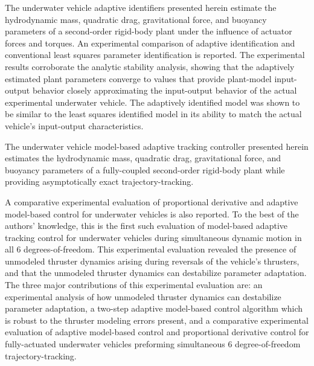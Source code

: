\documentclass{article}
\begin{document}
The underwater vehicle adaptive identifiers presented herein estimate the
hydrodynamic mass, quadratic drag, gravitational force, and buoyancy
parameters of a second-order rigid-body plant under the influence of
actuator forces and torques.  An experimental comparison of adaptive
identification and conventional least squares parameter identification
is reported. The experimental results corroborate the analytic
stability analysis, showing that the adaptively estimated plant
parameters converge to values that provide plant-model input-output
behavior closely approximating the input-output behavior of the actual
experimental underwater vehicle. The adaptively identified model was
shown to be similar to the least squares identified model in its
ability to match the actual vehicle's input-output characteristics.

The underwater vehicle model-based adaptive tracking controller presented herein
estimates the hydrodynamic mass, quadratic drag, gravitational force,
and buoyancy parameters of a fully-coupled second-order rigid-body
plant while providing asymptotically exact trajectory-tracking.

A comparative experimental evaluation of proportional derivative and
adaptive model-based control for underwater vehicles is also reported.
%
To the best of the authors' knowledge, this is the first such
evaluation of model-based adaptive tracking control for underwater
vehicles during simultaneous dynamic motion in all 6 degrees-of-freedom.
%
This experimental evaluation revealed the presence of unmodeled
thruster dynamics arising during reversals of the vehicle's thrusters,
and that the unmodeled thruster dynamics
can destabilize parameter adaptation.
%
The three major contributions of this experimental evaluation are: an
experimental analysis of how unmodeled thruster dynamics can
destabilize parameter adaptation, a two-step adaptive model-based
control algorithm which is robust to the thruster modeling errors
present, and a comparative experimental evaluation of adaptive
model-based control and proportional derivative control for
fully-actuated underwater vehicles preforming simultaneous 6
degree-of-freedom trajectory-tracking.
\end{document}
